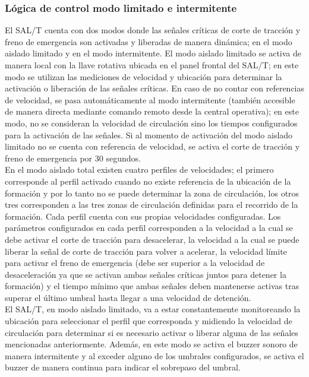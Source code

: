\subsubsection{Lógica de control modo limitado e intermitente}


El SAL/T cuenta con dos modos donde las señales críticas de corte de tracción y freno de emergencia son activadas y liberadas de manera dinámica; en el modo aislado limitado y en el modo intermitente. El modo aislado limitado se activa de manera local con la llave rotativa ubicada en el panel frontal del SAL/T; en este modo se utilizan las mediciones de velocidad y ubicación para determinar la activación o liberación de las señales críticas. En caso de no contar con referencias de velocidad, se pasa automáticamente al modo intermitente (también accesible de manera directa mediante comando remoto desde la central operativa); en este modo, no se consideran la velocidad de circulación sino los tiempos configurados para la activación de las señales. Si al momento de activación del modo aislado limitado no se cuenta con referencia de velocidad, se activa el corte de tracción y freno de emergencia por 30 segundos.\\ 


En el modo aislado total existen cuatro perfiles de velocidades; el primero corresponde al perfil activado cuando no existe referencia de la ubicación de la formación y por lo tanto no se puede determinar la zona de circulación, los otros tres corresponden a las tres zonas de circulación definidas para el recorrido de la formación. Cada perfil cuenta con sus propias velocidades configuradas. Los parámetros configurados en cada perfil corresponden a la velocidad a la cual se debe activar el corte de tracción para desacelerar, la velocidad a la cual se puede liberar la señal de corte de tracción para volver a acelerar, la velocidad límite para activar el freno de emergencia (debe ser superior a la velocidad de desaceleración ya que se activan ambas señales críticas juntos para detener la formación) y el tiempo mínimo que ambas señales deben mantenerse activas tras superar el último umbral hasta llegar a una velocidad de detención. \\ 

El SAL/T, en modo aislado limitado, va a estar constantemente monitoreando la ubicación para seleccionar el perfil que corresponda y midiendo la velocidad de circulación para determinar si es necesario activar o liberar alguna de las señales mencionadas anteriormente. Además, en este modo se activa el buzzer sonoro de manera intermitente y al exceder alguno de los umbrales configurados, se activa el buzzer de manera continua para indicar el sobrepaso del umbral. \\



